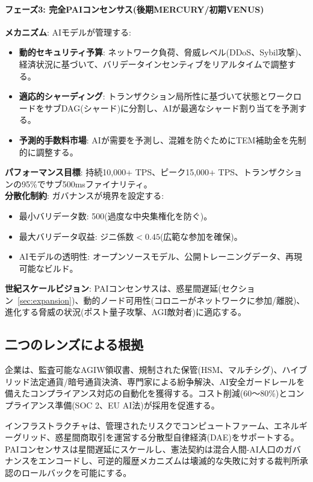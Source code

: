\documentclass[11pt]{article}
\begin{document}
\paragraph{フェーズ3: 完全PAIコンセンサス(後期MERCURY/初期VENUS)}
\textbf{メカニズム}: AIモデルが管理する:
\begin{itemize}[noitemsep]
  \item \textbf{動的セキュリティ予算}: ネットワーク負荷、脅威レベル(DDoS、Sybil攻撃)、経済状況に基づいて、バリデータインセンティブをリアルタイムで調整する。
  \item \textbf{適応的シャーディング}: トランザクション局所性に基づいて状態とワークロードをサブDAG(シャード)に分割し、AIが最適なシャード割り当てを予測する。
  \item \textbf{予測的手数料市場}: AIが需要を予測し、混雑を防ぐためにTEM補助金を先制的に調整する。
\end{itemize}
\textbf{パフォーマンス目標}: 持続10,000+ TPS、ピーク15,000+ TPS、トランザクションの95\%でサブ500msファイナリティ。\\
\textbf{分散化制約}: ガバナンスが境界を設定する:
\begin{itemize}[noitemsep]
  \item 最小バリデータ数: 500(過度な中央集権化を防ぐ)。
  \item 最大バリデータ収益: ジニ係数$<0.45$(広範な参加を確保)。
  \item AIモデルの透明性: オープンソースモデル、公開トレーニングデータ、再現可能なビルド。
\end{itemize}
\textbf{世紀スケールビジョン}: PAIコンセンサスは、惑星間遅延(セクション~\ref{sec:expansion})、動的ノード可用性(コロニーがネットワークに参加/離脱)、進化する脅威の状況(ポスト量子攻撃、AGI敵対者)に適応する。

\subsection{二つのレンズによる根拠}
\begin{description}[style=nextline]
  \item[短期(MERCURY紀元)] 企業は、監査可能なAGIW領収書、規制された保管(HSM、マルチシグ)、ハイブリッド法定通貨/暗号通貨決済、専門家による紛争解決、AI安全ガードレールを備えたコンプライアンス対応の自動化を獲得する。コスト削減(60〜80\%)とコンプライアンス準備(SOC 2、EU AI法)が採用を促進する。
  \item[世紀スケール(VENUSからANDROMEDA)] インフラストラクチャは、管理されたリスクでコンピュートファーム、エネルギーグリッド、惑星間商取引を運営する分散型自律経済(DAE)をサポートする。PAIコンセンサスは星間遅延にスケールし、憲法契約は混合人間-AI人口のガバナンスをエンコードし、可逆的履歴メカニズムは壊滅的な失敗に対する裁判所承認のロールバックを可能にする。
\end{description}
\end{document}
